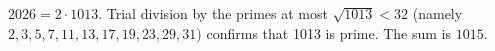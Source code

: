 $2026=2\cdot1013$. Trial division by the primes at most $\sqrt{1013}<32$ (namely $2,3,5,7,11,13,17,19,23,29,31$) confirms that 1013 is prime. The sum is $\boxed{1015}$.
